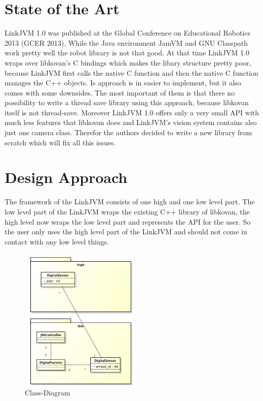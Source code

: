 \documentclass{juniorjournal}
\begin{document}
\section{State of the Art}
LinkJVM 1.0 was published at the Global Conference on Educational Robotics 2013 (GCER 2013).
While the Java environment JamVM and GNU Classpath work pretty well the robot library is not that good.
At that time LinkJVM 1.0 wraps over libkovan's C bindings which makes the libary structure pretty poor, because LinkJVM first calls the native C function and then the native C function manages the C++ objects.
Is approach is in easier to implement, but it also comes with some downsides.
The most important of them is that there no possibility to write a thread save library using this approach, because libkovan itself is not thread-save.
Moreover LinkJVM 1.0 offers only a very small API with much less features that libkovan does and LinkJVM's vision system contains also just one camera class.
Therefor the authors decided to write a new library from scratch which will fix all this issues. 

\section{Design Approach}
\label{sec:design-approach}
The framework of the LinkJVM consists of one high and one low level part.
The low level part of the LinkJVM wraps the existing C++ library of libkovan, 
the high level now wraps the low level part and represents the API for the user.
So the user only uses the high level part of the LinkJVM and should not come in 
contact with any low level things.

\begin{figure}[H]
\centering
\includegraphics[width=0.5\textwidth]{images/Class-Diagram.pdf}
\caption{Class-Diagram}
\label{fig:Class-Diagram}
\end{figure}
\end{document}
